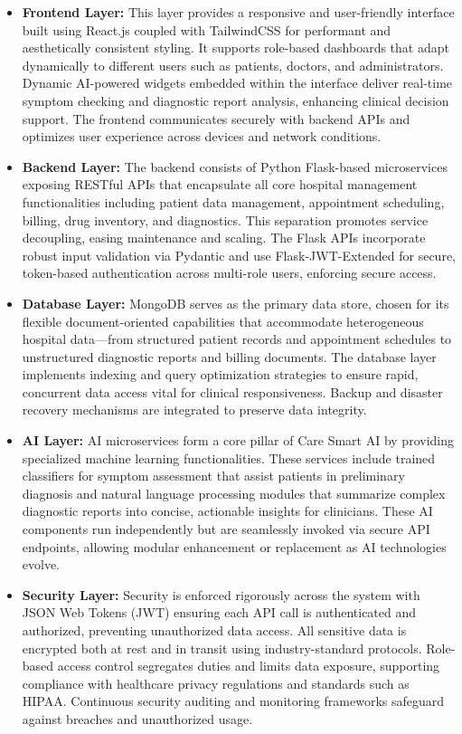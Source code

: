\documentclass[conference]{IEEEtran}
\begin{document}
\begin{itemize}
    \item \textbf{Frontend Layer:} This layer provides a responsive and user-friendly interface built using React.js coupled with TailwindCSS for performant and aesthetically consistent styling. It supports role-based dashboards that adapt dynamically to different users such as patients, doctors, and administrators. Dynamic AI-powered widgets embedded within the interface deliver real-time symptom checking and diagnostic report analysis, enhancing clinical decision support. The frontend communicates securely with backend APIs and optimizes user experience across devices and network conditions.

    \item \textbf{Backend Layer:} The backend consists of Python Flask-based microservices exposing RESTful APIs that encapsulate all core hospital management functionalities including patient data management, appointment scheduling, billing, drug inventory, and diagnostics. This separation promotes service decoupling, easing maintenance and scaling. The Flask APIs incorporate robust input validation via Pydantic and use Flask-JWT-Extended for secure, token-based authentication across multi-role users, enforcing secure access.

    \item \textbf{Database Layer:} MongoDB serves as the primary data store, chosen for its flexible document-oriented capabilities that accommodate heterogeneous hospital data—from structured patient records and appointment schedules to unstructured diagnostic reports and billing documents. The database layer implements indexing and query optimization strategies to ensure rapid, concurrent data access vital for clinical responsiveness. Backup and disaster recovery mechanisms are integrated to preserve data integrity.

    \item \textbf{AI Layer:} AI microservices form a core pillar of Care Smart AI by providing specialized machine learning functionalities. These services include trained classifiers for symptom assessment that assist patients in preliminary diagnosis and natural language processing modules that summarize complex diagnostic reports into concise, actionable insights for clinicians. These AI components run independently but are seamlessly invoked via secure API endpoints, allowing modular enhancement or replacement as AI technologies evolve.

    \item \textbf{Security Layer:} Security is enforced rigorously across the system with JSON Web Tokens (JWT) ensuring each API call is authenticated and authorized, preventing unauthorized data access. All sensitive data is encrypted both at rest and in transit using industry-standard protocols. Role-based access control segregates duties and limits data exposure, supporting compliance with healthcare privacy regulations and standards such as HIPAA. Continuous security auditing and monitoring frameworks safeguard against breaches and unauthorized usage.
\end{itemize}
\end{document}
